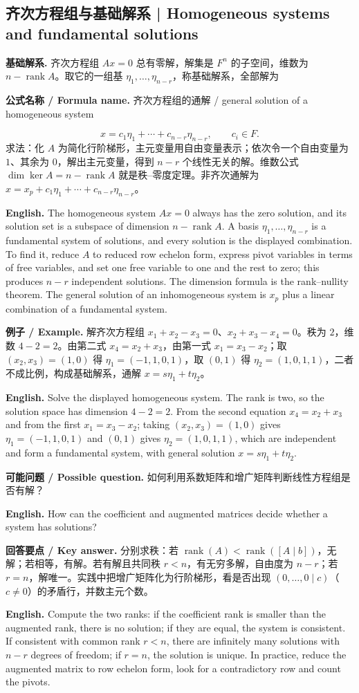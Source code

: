 \documentclass[UTF8,11pt,a4paper]{ctexart}
\newcommand{\EN}[1]{\par\noindent\textbf{English.} #1\par}
\newcommand{\FORMULA}[2]{\par\noindent\textbf{公式名称 / Formula name.} #1 / #2\par}
\newcommand{\EX}[2]{\par\noindent\textbf{例子 / Example.} #1\par\EN{#2}}
\newcommand{\ASK}[4]{\par\noindent\textbf{可能问题 / Possible question.} #1\par\EN{#2}\noindent\textbf{回答要点 / Key answer.} #3\par\EN{#4}\medskip}
\begin{document}
\subsection{齐次方程组与基础解系 | Homogeneous systems and fundamental solutions}
\noindent\textbf{基础解系.} 齐次方程组 $Ax=0$ 总有零解，解集是 $F^n$ 的子空间，维数为 $n-\operatorname{rank}A$。取它的一组基 $\eta_1,\dots,\eta_{n-r}$，称基础解系，全部解为
\FORMULA{齐次方程组的通解}{general solution of a homogeneous system}
\[
x=c_1\eta_1+\cdots+c_{n-r}\eta_{n-r},\qquad c_i\in F.
\]
求法：化 $A$ 为简化行阶梯形，主元变量用自由变量表示；依次令一个自由变量为 $1$、其余为 $0$，解出主元变量，得到 $n-r$ 个线性无关的解。维数公式 $\dim\ker A=n-\operatorname{rank}A$ 就是秩--零度定理。非齐次通解为 $x=x_p+c_1\eta_1+\cdots+c_{n-r}\eta_{n-r}$。
\EN{The homogeneous system $Ax=0$ always has the zero solution, and its solution set is a subspace of dimension $n-\operatorname{rank}A$. A basis $\eta_1,\dots,\eta_{n-r}$ is a fundamental system of solutions, and every solution is the displayed combination. To find it, reduce $A$ to reduced row echelon form, express pivot variables in terms of free variables, and set one free variable to one and the rest to zero; this produces $n-r$ independent solutions. The dimension formula is the rank--nullity theorem. The general solution of an inhomogeneous system is $x_p$ plus a linear combination of a fundamental system.}
\EX{解齐次方程组 $x_1+x_2-x_3=0$、$x_2+x_3-x_4=0$。秩为 $2$，维数 $4-2=2$。由第二式 $x_4=x_2+x_3$，由第一式 $x_1=x_3-x_2$；取 $(x_2,x_3)=(1,0)$ 得 $\eta_1=(-1,1,0,1)$，取 $(0,1)$ 得 $\eta_2=(1,0,1,1)$，二者不成比例，构成基础解系，通解 $x=s\eta_1+t\eta_2$。}{Solve the displayed homogeneous system. The rank is two, so the solution space has dimension $4-2=2$. From the second equation $x_4=x_2+x_3$ and from the first $x_1=x_3-x_2$; taking $(x_2,x_3)=(1,0)$ gives $\eta_1=(-1,1,0,1)$ and $(0,1)$ gives $\eta_2=(1,0,1,1)$, which are independent and form a fundamental system, with general solution $x=s\eta_1+t\eta_2$.}
\ASK{如何利用系数矩阵和增广矩阵判断线性方程组是否有解？}{How can the coefficient and augmented matrices decide whether a system has solutions?}{分别求秩：若 $\operatorname{rank}(A)<\operatorname{rank}([A\mid b])$，无解；若相等，有解。若有解且共同秩 $r<n$，有无穷多解，自由度为 $n-r$；若 $r=n$，解唯一。实践中把增广矩阵化为行阶梯形，看是否出现 $(0,\dots,0\mid c)$（$c\ne0$）的矛盾行，并数主元个数。}{Compute the two ranks: if the coefficient rank is smaller than the augmented rank, there is no solution; if they are equal, the system is consistent. If consistent with common rank $r<n$, there are infinitely many solutions with $n-r$ degrees of freedom; if $r=n$, the solution is unique. In practice, reduce the augmented matrix to row echelon form, look for a contradictory row and count the pivots.}
\end{document}
